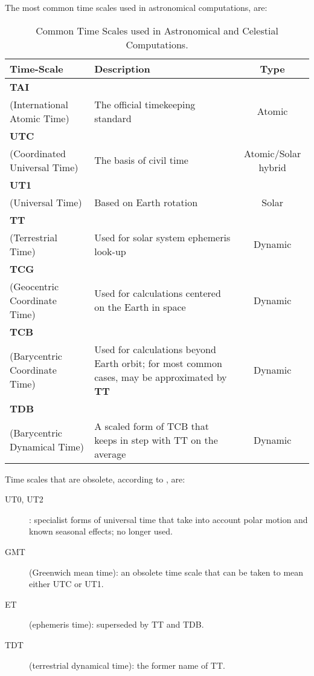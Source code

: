 The most common time scales used in astronomical computations, are:
\begin{table}
  \centering
\begin{tabularx}{\textwidth}{>{\raggedright\arraybackslash}X >{\raggedright\arraybackslash}X c}
    \bf{Time-Scale} & \bf{Description} & \bf{Type} \\
  \hline
  \textbf{TAI}\\ \scriptsize{(International Atomic Time)} & The official timekeeping standard & Atomic \\
  \textbf{UTC}\\ \scriptsize{(Coordinated Universal Time)} & The basis of civil time & Atomic/Solar hybrid \\
  \textbf{UT1}\\ \scriptsize{(Universal Time)} & Based on Earth rotation & Solar \\
  \textbf{TT}\\ \scriptsize{(Terrestrial Time)} & Used for solar system ephemeris look-up &  Dynamic \\
  \textbf{TCG}\\ \scriptsize{(Geocentric Coordinate Time)} & Used for calculations centered on the Earth in space & Dynamic \\
  \textbf{TCB}\\ \scriptsize{(Barycentric Coordinate Time)} & Used for calculations beyond Earth orbit; for most common cases, may be approximated by \textbf{TT} & Dynamic \\
  \textbf{TDB}\\ \scriptsize{(Barycentric Dynamical Time)} & A scaled form of TCB that keeps in step with TT
on the average & Dynamic \\
\end{tabularx}
\caption{Common Time Scales used in Astronomical and Celestial Computations.}
\end{table}

Time scales that are obsolete, according to \cite{SOFA}, are:
\begin{description}
  \item[UT0, UT2]: specialist forms of universal time that take into account polar motion and
known seasonal effects; no longer used.
  \item[GMT] (Greenwich mean time): an obsolete time scale that can be taken to mean either
UTC or UT1.
  \item[ET] (ephemeris time): superseded by TT and TDB.
  \item[TDT] (terrestrial dynamical time): the former name of TT.
\end{description}

